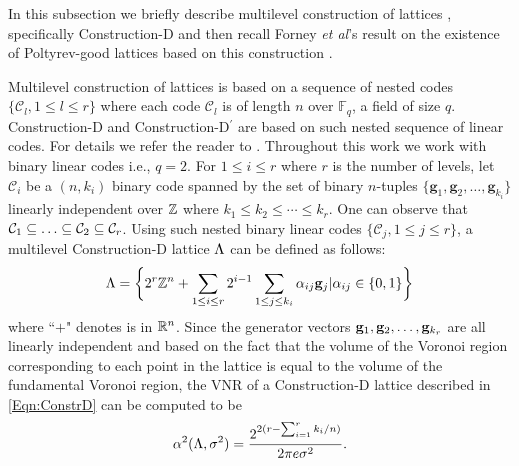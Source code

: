 \documentclass[journal,twocolumn]{IEEEtran}
\begin{document}
 In this subsection we briefly describe multilevel construction of lattices \cite{BarnesSloane83,conwaysphere}, specifically Construction-D and then recall Forney {\em et al}'s result on the existence of Poltyrev-good lattices based on this construction \cite{forney2000}.

		Multilevel construction of lattices is based on a sequence of nested codes $\{\mathcal{C}_{l},1\leq l\leq r\}$ where each code $\mathcal{C}_{l}$ is of length $n$ over $\mathbb{F}_q$, a field of size $q$. Construction-D and Construction-D$^{\prime}$ are based on such nested sequence of linear codes. For details we refer the reader to \cite{conwaysphere}. Throughout this work we work with binary linear codes i.e., $q=2$. For $1\leq i \leq r$ where $r$ is the number of levels, let $\mathcal{C}_{i}$ be a $(n,k_i)$ binary code spanned by the set of binary $n$-tuples $\{\mathbf{g}_1,\mathbf{g}_2,\ldots,\mathbf{g}_{k_i}\}$ linearly independent over $\mathbb{Z}$ where $k_{1}\leq k_{2}\leq \cdots \leq k_{r}$. One can observe that $\mathcal{C}_{1}\subseteq \ldots \subseteq \mathcal{C}_{2}\subseteq \mathcal{C}_{r}$. Using such nested binary linear codes $\{\mathcal{C}_{j},1\leq j\leq r\}$, a multilevel Construction-D lattice $\Lambda$ can be defined as follows:
\begin{align}\label{Eqn:ConstrD}
 \Lambda=\biggl\{2^{r}\mathbb{Z}^{n}+\sum_{1\leq i\leq r}2^{i-1}\sum_{1\leq j\leq k_{i}}\alpha_{ij}\mathbf{g}_j|\alpha_{ij}\in\{0,1\}\biggr\}
\end{align}
where ``$+$" denotes is in $\mathbb{R}^{n}$.  Since the generator vectors $\mathbf{g}_{1},\mathbf{g}_{2},\ldots,\mathbf{g}_{k_{r}}$ are all linearly independent and based on the fact that the volume of the Voronoi region corresponding to each point in the lattice is equal to the 	volume of the fundamental Voronoi region, the VNR of a Construction-D lattice described in \eqref{Eqn:ConstrD} can be computed to be
\begin{equation}\label{Eqn:VNRConstrutionD}
    \alpha^{2}(\Lambda,\sigma^{2})=\frac{2^{2(r-\sum_{i=1}^{r}k_{i}/n)}}{2\pi e\sigma^{2}}.
\end{equation}
\end{document}
